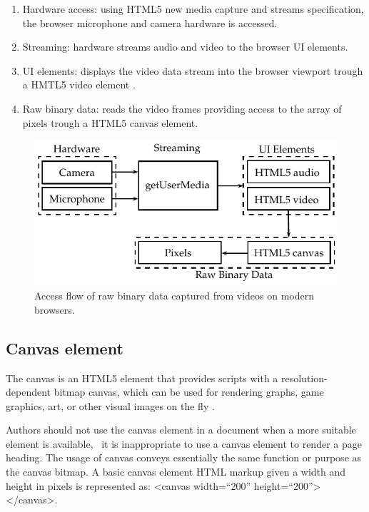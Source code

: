 \begin{enumerate}
  \item  Hardware access: using HTML5 new media capture and streams specification, the browser microphone and camera hardware is accessed.
  \item Streaming: hardware streams audio and video to the browser UI elements.
  \item UI elements: displays the video data stream into the browser viewport trough a HMTL5 video element \cite{WC2006}.
  \item Raw binary data: reads the video frames providing access to the array of pixels trough a HTML5 canvas element.
\end{enumerate}

\begin{figure}[!htb]
  \centering
  \includegraphics{chapters/basic_concepts/get_user_media.pdf}
  \caption{Access flow of raw binary data captured from videos on modern browsers.}
  \label{figure:get_user_media}
\end{figure}


\subsection{Canvas element} %
\label{sub:basic_concepts:web:canvas_element}

The canvas is an HTML5 element that provides scripts with a resolution-dependent bitmap canvas, which can be used for rendering graphs, game graphics, art, or other visual images on the fly \cite{Canvas2013}.

Authors should not use the canvas element in a document when a more suitable element is available, \eg\ it is inappropriate to use a canvas element to render a page heading. The usage of canvas conveys essentially the same function or purpose as the canvas bitmap. A basic canvas element HTML markup given a width and height in pixels is represented as: <canvas width=``200'' height=``200''></canvas>.

